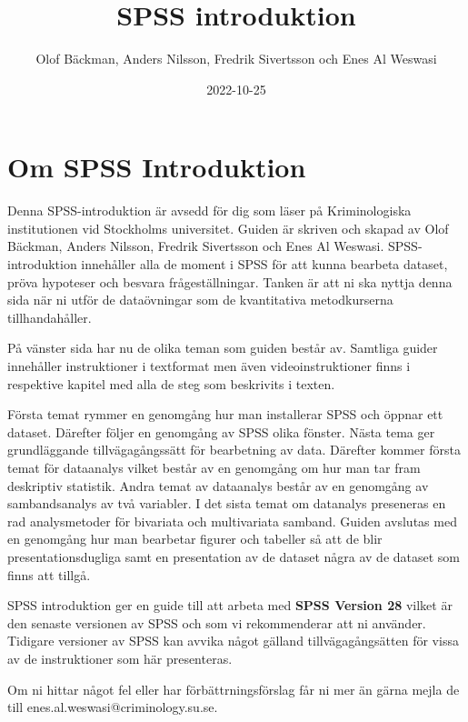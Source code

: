 \documentclass[
]{book}
\title{SPSS introduktion}
\author{Olof Bäckman, Anders Nilsson, Fredrik Sivertsson och Enes Al Weswasi}
\date{2022-10-25}
\begin{document}
\maketitle

{
\hypersetup{linkcolor=}
\setcounter{tocdepth}{1}
\tableofcontents
}
\hypertarget{om-spss-introduktion}{%
\chapter*{Om SPSS Introduktion}\label{om-spss-introduktion}}

Denna SPSS-introduktion är avsedd för dig som läser på Kriminologiska institutionen vid Stockholms universitet. Guiden är skriven och skapad av Olof Bäckman, Anders Nilsson, Fredrik Sivertsson och Enes Al Weswasi. SPSS-introduktion innehåller alla de moment i SPSS för att kunna bearbeta dataset, pröva hypoteser och besvara frågeställningar. Tanken är att ni ska nyttja denna sida när ni utför de dataövningar som de kvantitativa metodkurserna tillhandahåller.

På vänster sida har nu de olika teman som guiden består av. Samtliga guider innehåller instruktioner i textformat men även videoinstruktioner finns i respektive kapitel med alla de steg som beskrivits i texten.

Första temat rymmer en genomgång hur man installerar SPSS och öppnar ett dataset. Därefter följer en genomgång av SPSS olika fönster. Nästa tema ger grundläggande tillvägagångssätt för bearbetning av data. Därefter kommer första temat för dataanalys vilket består av en genomgång om hur man tar fram deskriptiv statistik. Andra temat av dataanalys består av en genomgång av sambandsanalys av två variabler. I det sista temat om datanalys preseneras en rad analysmetoder för bivariata och multivariata samband. Guiden avslutas med en genomgång hur man bearbetar figurer och tabeller så att de blir presentationsdugliga samt en presentation av de dataset några av de dataset som finns att tillgå.

SPSS introduktion ger en guide till att arbeta med \textbf{SPSS Version 28} vilket är den senaste versionen av SPSS och som vi rekommenderar att ni använder. Tidigare versioner av SPSS kan avvika något gälland tillvägagångsätten för vissa av de instruktioner som här presenteras.

Om ni hittar något fel eller har förbättrningsförslag får ni mer än gärna mejla de till enes.al.weswasi@criminology.su.se.
\end{document}

